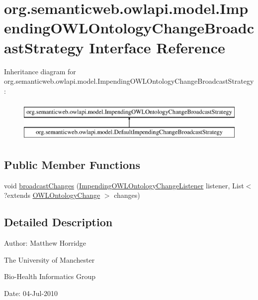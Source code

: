\hypertarget{interfaceorg_1_1semanticweb_1_1owlapi_1_1model_1_1_impending_o_w_l_ontology_change_broadcast_strategy}{\section{org.\-semanticweb.\-owlapi.\-model.\-Impending\-O\-W\-L\-Ontology\-Change\-Broadcast\-Strategy Interface Reference}
\label{interfaceorg_1_1semanticweb_1_1owlapi_1_1model_1_1_impending_o_w_l_ontology_change_broadcast_strategy}
}
Inheritance diagram for org.\-semanticweb.\-owlapi.\-model.\-Impending\-O\-W\-L\-Ontology\-Change\-Broadcast\-Strategy\-:\begin{figure}[H]
\begin{center}
\leavevmode
\includegraphics[height=2.000000cm]{interfaceorg_1_1semanticweb_1_1owlapi_1_1model_1_1_impending_o_w_l_ontology_change_broadcast_strategy}
\end{center}
\end{figure}
\subsection*{Public Member Functions}
\begin{DoxyCompactItemize}
\item 
void \hyperlink{interfaceorg_1_1semanticweb_1_1owlapi_1_1model_1_1_impending_o_w_l_ontology_change_broadcast_strategy_a1df64ea0e0e075f4fa4f58fca53bb300}{broadcast\-Changes} (\hyperlink{interfaceorg_1_1semanticweb_1_1owlapi_1_1model_1_1_impending_o_w_l_ontology_change_listener}{Impending\-O\-W\-L\-Ontology\-Change\-Listener} listener, List$<$?extends \hyperlink{classorg_1_1semanticweb_1_1owlapi_1_1model_1_1_o_w_l_ontology_change}{O\-W\-L\-Ontology\-Change} $>$ changes)
\end{DoxyCompactItemize}


\subsection{Detailed Description}
Author\-: Matthew Horridge\par
 The University of Manchester\par
 Bio-\/\-Health Informatics Group\par
 Date\-: 04-\/\-Jul-\/2010 

